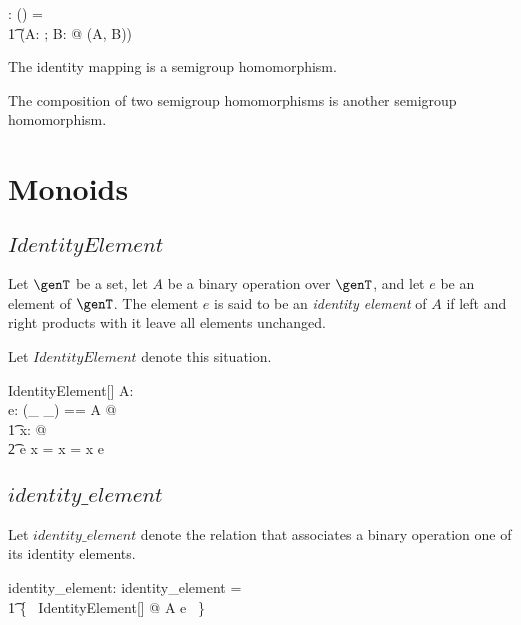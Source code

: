\documentclass{amsart}
\begin{document}
\begin{gendef}[\genT, \genU]
	\homSemigroup: \semigroup \genT \cross \semigroup \genU \fun \power (\genT \pfun \genU)
\where
	\homSemigroup = \\
	\t1	(\lambda A: \semigroup \genT; B: \semigroup \genU @ \homBinOp(A, B))
\end{gendef}

\begin{remark}
The identity mapping is a semigroup homomorphism.
\end{remark}

\begin{remark}
The composition of two semigroup homomorphisms is another semigroup homomorphism.
\end{remark}

\section{Monoids}

\subsection{$IdentityElement$}

Let $\genT$ be a set, let $A$ be a binary operation over $\genT$, and let $e$ be an element of $\genT$.
The element $e$ is said to be an {\em identity element} of $A$ if left and right 
products with it leave all elements unchanged.

Let $IdentityElement$ denote this situation.

\begin{schema}{IdentityElement}[\genT]
A: \binop \genT \\
e: \genT
\where
\LET (\_ \mulG \_) == A @ \\
\t1	\forall x: \genT @ \\
\t2		e \mulG x = x = x \mulG e
\end{schema}

\subsection{$identity\_element$}

Let $identity\_element$ denote the relation that associates a binary operation one of its identity elements.

\begin{gendef}[\genT]
identity\_element: \binop \genT \rel \genT
\where
identity\_element = \\
\t1	\{~ IdentityElement[\genT] @ A \mapsto e ~\}
\end{gendef}
\end{document}
